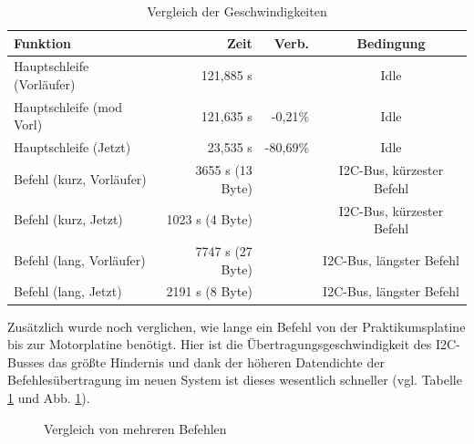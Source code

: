 \begin{table}[htb]
\begin{center}
	\begin{tabular}{|l||r|r|c|}
		\hline
		\textbf{Funktion} & \textbf{Zeit} & \textbf{Verb.} & \textbf{Bedingung} \\ \hline \hline
		Hauptschleife (Vorläufer) & 121,885 \textmu{}s & & Idle \\ \hline
		Hauptschleife (mod Vorl) & 121,635 \textmu{}s & -0,21\% & Idle \\ \hline
		Hauptschleife (Jetzt) & 23,535 \textmu{}s & -80,69\% & Idle \\ \hline \hline
		Befehl (kurz, Vorläufer) & 3655 \textmu{}s (13 Byte) & & I2C-Bus, kürzester Befehl \\ \hline
		Befehl (kurz, Jetzt) & 1023 \textmu{}s (4 Byte) & & I2C-Bus, kürzester Befehl \\ \hline
		Befehl (lang, Vorläufer) & 7747 \textmu{}s (27 Byte) & & I2C-Bus, längster Befehl \\ \hline
		Befehl (lang, Jetzt) & 2191 \textmu{}s (8 Byte) & & I2C-Bus, längster Befehl \\ \hline
	\end{tabular}
	\caption{\label{vergl_speed} Vergleich der Geschwindigkeiten}
\end{center}
\end{table}
Zusätzlich wurde noch verglichen, wie lange ein Befehl von der Praktikumsplatine bis zur Motorplatine benötigt.
Hier ist die Übertragungsgeschwindigkeit des I2C-Busses das größte Hindernis und dank der höheren Datendichte
der Befehlesübertragung im neuen System ist dieses wesentlich schneller (vgl. Tabelle \ref{vergl_speed} und Abb.
 \ref{vergl_befehle}).
\begin{figure}[htb]
 \centering
 \caption{\label{vergl_befehle}Vergleich von mehreren Befehlen}
\end{figure}
